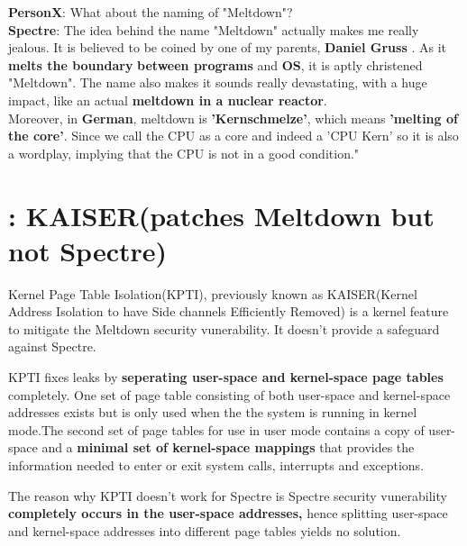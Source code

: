 \documentclass[12pt]{article}
\begin{document}
\begin{appendices}
	\textbf{PersonX}: What about the naming of "Meltdown"?\\
	
	\textbf{Spectre}: The idea behind the name "Meltdown" actually makes me really jealous. It is believed to be coined by one of my parents, \textbf{Daniel Gruss} . As it \textbf{melts the boundary} \textbf{between programs} and \textbf{OS}, it is aptly christened "Meltdown". The name also makes it sounds really devastating, with a huge impact, like an actual \textbf{meltdown in a nuclear reactor}.\\
	Moreover, in \textbf{German}, meltdown is \textbf{'Kernschmelze'}, which means \textbf{'melting of the core'}. Since we call the CPU as a core and indeed a 'CPU Kern' so it is also a wordplay, implying that the CPU is not in a good condition."


\section{: KAISER(patches Meltdown but not Spectre)}

Kernel Page Table Isolation(KPTI), previously known as KAISER(Kernel Address Isolation to have Side channels Efficiently Removed) is a kernel feature to mitigate the Meltdown security vunerability. It doesn't provide a safeguard against Spectre.

KPTI fixes leaks by \textbf{seperating user-space and kernel-space page tables} completely. One set of page table consisting of both user-space and kernel-space addresses exists but is only used when the the system is running in kernel mode.The second set of page tables for use in user mode contains a copy of user-space and a \textbf{minimal set of kernel-space mappings} that provides the information needed to enter or exit system calls, interrupts and exceptions.

The reason why KPTI doesn't work for Spectre is Spectre security vunerability \textbf{completely occurs in the user-space addresses,} hence splitting user-space and kernel-space addresses into different page tables yields no solution.

   
	
\end{appendices}
\end{document}

